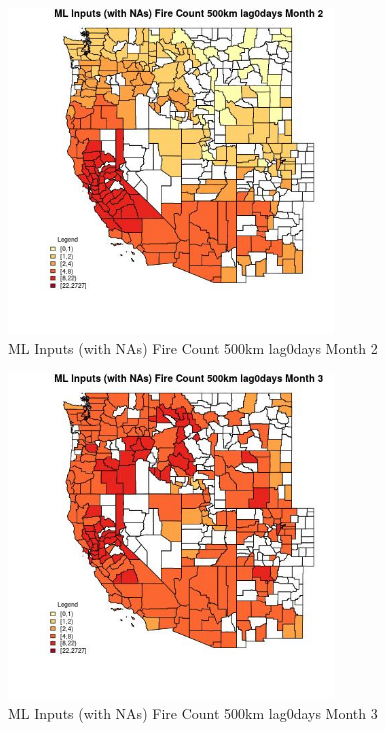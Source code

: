 \begin{figure} 
\centering  
\includegraphics[width=0.77\textwidth]{Code_Outputs/Report_ML_input_PM25_Step4_part_f_de_duplicated_aveswNAs_CountyFire_Count_500km_lag0daysmedianMonth2.jpg} 
\caption{\label{fig:Report_ML_input_PM25_Step4_part_f_de_duplicated_aveswNAsCountyFire_Count_500km_lag0daysmedianMonth2}ML Inputs (with NAs) Fire Count 500km lag0days Month 2} 
\end{figure} 
 

\begin{figure} 
\centering  
\includegraphics[width=0.77\textwidth]{Code_Outputs/Report_ML_input_PM25_Step4_part_f_de_duplicated_aveswNAs_CountyFire_Count_500km_lag0daysmedianMonth3.jpg} 
\caption{\label{fig:Report_ML_input_PM25_Step4_part_f_de_duplicated_aveswNAsCountyFire_Count_500km_lag0daysmedianMonth3}ML Inputs (with NAs) Fire Count 500km lag0days Month 3} 
\end{figure} 
 

